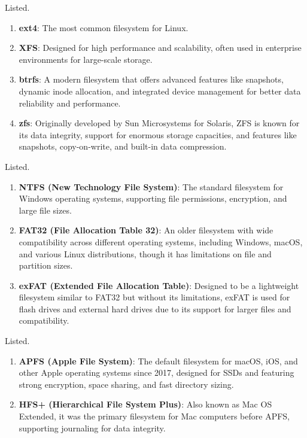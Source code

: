 \documentclass{article}
\begin{document}
  \begin{example}
    Listed. 
    \begin{enumerate}
      \item \textbf{ext4}: The most common filesystem for Linux. 
      \item \textbf{XFS}: Designed for high performance and scalability, often used in enterprise environments for large-scale storage.
      \item \textbf{btrfs}: A modern filesystem that offers advanced features like snapshots, dynamic inode allocation, and integrated device management for better data reliability and performance. 
      \item \textbf{zfs}: Originally developed by Sun Microsystems for Solaris, ZFS is known for its data integrity, support for enormous storage capacities, and features like snapshots, copy-on-write, and built-in data compression.
    \end{enumerate}
  \end{example}

  \begin{example}
    Listed. 
    \begin{enumerate} 
      \item \textbf{NTFS (New Technology File System)}: The standard filesystem for Windows operating systems, supporting file permissions, encryption, and large file sizes.
      \item \textbf{FAT32 (File Allocation Table 32)}: An older filesystem with wide compatibility across different operating systems, including Windows, macOS, and various Linux distributions, though it has limitations on file and partition sizes.
      \item \textbf{exFAT (Extended File Allocation Table)}: Designed to be a lightweight filesystem similar to FAT32 but without its limitations, exFAT is used for flash drives and external hard drives due to its support for larger files and compatibility.
    \end{enumerate}
  \end{example}

  \begin{example}
    Listed. 
    \begin{enumerate}
      \item \textbf{APFS (Apple File System)}: The default filesystem for macOS, iOS, and other Apple operating systems since 2017, designed for SSDs and featuring strong encryption, space sharing, and fast directory sizing.
      \item \textbf{HFS+ (Hierarchical File System Plus)}: Also known as Mac OS Extended, it was the primary filesystem for Mac computers before APFS, supporting journaling for data integrity.
    \end{enumerate}
  \end{example}
\end{document}
